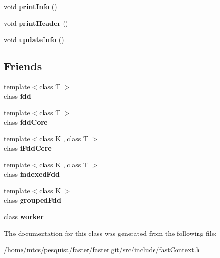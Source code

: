 \begin{DoxyCompactItemize}
\item 
\hypertarget{classfaster_1_1fastContext_a0258ce4c9efa6df4cdf46613132c9fd0}{}void {\bfseries print\+Info} ()\label{classfaster_1_1fastContext_a0258ce4c9efa6df4cdf46613132c9fd0}

\item 
\hypertarget{classfaster_1_1fastContext_a721a0db53e603bff27578e040b616f6f}{}void {\bfseries print\+Header} ()\label{classfaster_1_1fastContext_a721a0db53e603bff27578e040b616f6f}

\item 
\hypertarget{classfaster_1_1fastContext_ae6e69c86414bc5333da72aef13257d26}{}void {\bfseries update\+Info} ()\label{classfaster_1_1fastContext_ae6e69c86414bc5333da72aef13257d26}

\end{DoxyCompactItemize}
\subsection*{Friends}
\begin{DoxyCompactItemize}
\item 
\hypertarget{classfaster_1_1fastContext_a4fef19fb2fc81aa8f7f34f9401f30a6a}{}{\footnotesize template$<$class T $>$ }\\class {\bfseries fdd}\label{classfaster_1_1fastContext_a4fef19fb2fc81aa8f7f34f9401f30a6a}

\item 
\hypertarget{classfaster_1_1fastContext_a351468342339dbaff3d4c867f62ff479}{}{\footnotesize template$<$class T $>$ }\\class {\bfseries fdd\+Core}\label{classfaster_1_1fastContext_a351468342339dbaff3d4c867f62ff479}

\item 
\hypertarget{classfaster_1_1fastContext_accc85d808e1894334219d2e9806c0624}{}{\footnotesize template$<$class K , class T $>$ }\\class {\bfseries i\+Fdd\+Core}\label{classfaster_1_1fastContext_accc85d808e1894334219d2e9806c0624}

\item 
\hypertarget{classfaster_1_1fastContext_a0da7c6b1bc8838a587f28aa48122f8ae}{}{\footnotesize template$<$class K , class T $>$ }\\class {\bfseries indexed\+Fdd}\label{classfaster_1_1fastContext_a0da7c6b1bc8838a587f28aa48122f8ae}

\item 
\hypertarget{classfaster_1_1fastContext_a49b56a3cf60e23045ffa4f8edb5dc82d}{}{\footnotesize template$<$class K $>$ }\\class {\bfseries grouped\+Fdd}\label{classfaster_1_1fastContext_a49b56a3cf60e23045ffa4f8edb5dc82d}

\item 
\hypertarget{classfaster_1_1fastContext_a4636d2eabf003b9aa517f234ac288a6c}{}class {\bfseries worker}\label{classfaster_1_1fastContext_a4636d2eabf003b9aa517f234ac288a6c}

\end{DoxyCompactItemize}


The documentation for this class was generated from the following file\+:\begin{DoxyCompactItemize}
\item 
/home/mtcs/pesquisa/faster/faster.\+git/src/include/fast\+Context.\+h\end{DoxyCompactItemize}
